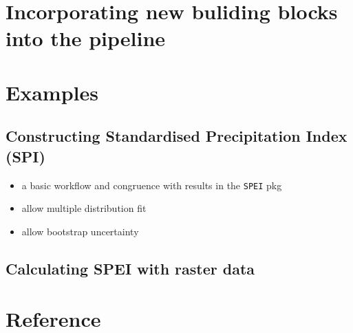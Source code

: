 \documentclass[
]{article}
\providecommand{\tightlist}{%
  \setlength{\itemsep}{0pt}\setlength{\parskip}{0pt}}\usepackage{longtable,booktabs,array}
\begin{document}
\hypertarget{sec-incorporating-new-buliding-blocks-into-the-pipeline}{%
\section{Incorporating new buliding blocks into the
pipeline}\label{sec-incorporating-new-buliding-blocks-into-the-pipeline}}

\hypertarget{sec-examples}{%
\section{Examples}\label{sec-examples}}

\hypertarget{constructing-standardised-precipitation-index-spi}{%
\subsection{Constructing Standardised Precipitation Index
(SPI)}\label{constructing-standardised-precipitation-index-spi}}

\begin{itemize}
\tightlist
\item
  a basic workflow and congruence with results in the \texttt{SPEI} pkg
\item
  allow multiple distribution fit
\item
  allow bootstrap uncertainty
\end{itemize}

\hypertarget{calculating-spei-with-raster-data}{%
\subsection{Calculating SPEI with raster
data}\label{calculating-spei-with-raster-data}}

\hypertarget{reference}{%
\section*{Reference}\label{reference}}
\end{document}
